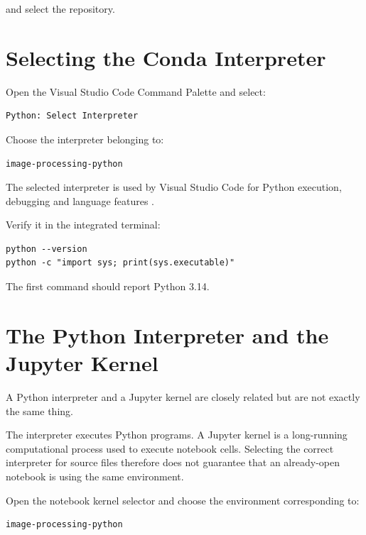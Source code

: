 and select the repository.


\section{Selecting the Conda Interpreter}
\label{sec:vscode-interpreter}

Open the Visual Studio Code Command Palette and select:

\begin{verbatim}
Python: Select Interpreter
\end{verbatim}

Choose the interpreter belonging to:

\begin{verbatim}
image-processing-python
\end{verbatim}

The selected interpreter is used by Visual Studio Code for Python
execution, debugging and language features
\cite{vscode_python_environments}.

Verify it in the integrated terminal:

\begin{verbatim}
python --version
python -c "import sys; print(sys.executable)"
\end{verbatim}

The first command should report Python 3.14.


\section{The Python Interpreter and the Jupyter Kernel}
\label{sec:interpreter-kernel}

A Python interpreter and a Jupyter kernel are closely related but are
not exactly the same thing.

The interpreter executes Python programs. A Jupyter kernel is a
long-running computational process used to execute notebook cells.
Selecting the correct interpreter for source files therefore does not
guarantee that an already-open notebook is using the same
environment.

Open the notebook kernel selector and choose the environment
corresponding to:

\begin{verbatim}
image-processing-python
\end{verbatim}

